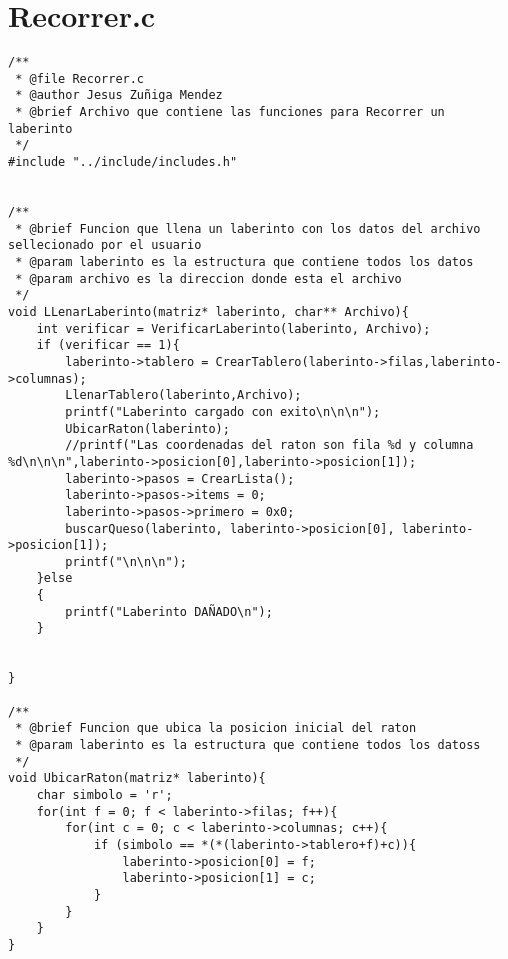 \section{Recorrer.c}
\begin{verbatim}
/**
 * @file Recorrer.c
 * @author Jesus Zuñiga Mendez
 * @brief Archivo que contiene las funciones para Recorrer un laberinto
 */
#include "../include/includes.h"


/**
 * @brief Funcion que llena un laberinto con los datos del archivo sellecionado por el usuario
 * @param laberinto es la estructura que contiene todos los datos
 * @param archivo es la direccion donde esta el archivo
 */
void LLenarLaberinto(matriz* laberinto, char** Archivo){
    int verificar = VerificarLaberinto(laberinto, Archivo);
    if (verificar == 1){
        laberinto->tablero = CrearTablero(laberinto->filas,laberinto->columnas);
        LlenarTablero(laberinto,Archivo);
        printf("Laberinto cargado con exito\n\n\n");
        UbicarRaton(laberinto);
        //printf("Las coordenadas del raton son fila %d y columna %d\n\n\n",laberinto->posicion[0],laberinto->posicion[1]);
        laberinto->pasos = CrearLista();
        laberinto->pasos->items = 0;
        laberinto->pasos->primero = 0x0;
        buscarQueso(laberinto, laberinto->posicion[0], laberinto->posicion[1]);
        printf("\n\n\n");
    }else
    {
        printf("Laberinto DAÑADO\n");
    }
    

}

/**
 * @brief Funcion que ubica la posicion inicial del raton
 * @param laberinto es la estructura que contiene todos los datoss
 */
void UbicarRaton(matriz* laberinto){
    char simbolo = 'r';
    for(int f = 0; f < laberinto->filas; f++){
        for(int c = 0; c < laberinto->columnas; c++){
            if (simbolo == *(*(laberinto->tablero+f)+c)){
                laberinto->posicion[0] = f;
                laberinto->posicion[1] = c;
            }
        }
    } 
}


\end{verbatim}
